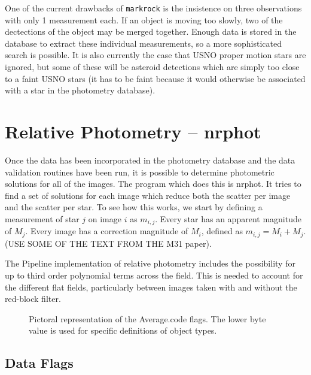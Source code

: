 \documentclass{article}
\begin{document}
One of the current drawbacks of {\tt markrock} is the insistence on
three observations with only 1 measurement each.  If an object is
moving too slowly, two of the dectections of the object may be merged
together.  Enough data is stored in the database to extract these
individual measurements, so a more sophisticated search is possible.
It is also currently the case that USNO proper motion stars are
ignored, but some of these will be asteroid detections which are
simply too close to a faint USNO stars (it has to be faint because it
would otherwise be associated with a star in the photometry
database).  

\section{Relative Photometry -- nrphot}

Once the data has been incorporated in the photometry database and the
data validation routines have been run, it is possible to determine
photometric solutions for all of the images.  The program which does
this is nrphot.  It tries to find a set of solutions for each image
which reduce both the scatter per image and the scatter per star.  To
see how this works, we start by defining a measurement of star $j$ on
image $i$ as $m_{i,j}$.  Every star has an apparent magnitude of
$M_j$.  Every image has a correction magnitude of $M_i$, defined as
$m_{i,j}= M_i + M_j$.  (USE SOME OF THE TEXT FROM THE M31 paper).  

The Pipeline implementation of relative photometry includes the
possibility for up to third order polynomial terms across the field.
This is needed to account for the different flat fields, particularly
between images taken with and without the red-block filter.  

\begin{figure}
\caption{\label{flags} 
Pictoral representation of the Average.code flags.  The lower byte
value is used for specific definitions of object types.
}
\end{figure}

\subsection{Data Flags}
\end{document}
